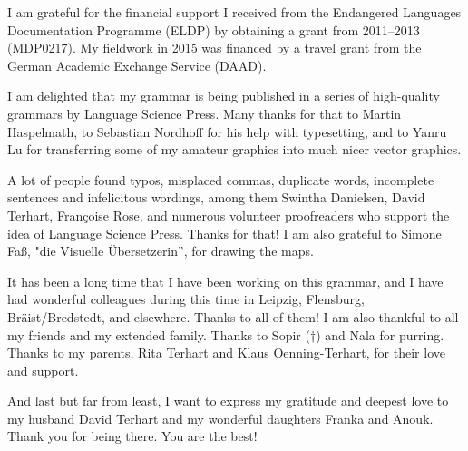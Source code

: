 I am grateful for the financial support I received from the Endangered Languages Documentation Programme (ELDP) by obtaining a grant from 2011–2013 (MDP0217). My fieldwork in 2015 was financed by a travel grant from the German Academic Exchange Service (DAAD).

I am delighted that my grammar is being published in a series of high-quality grammars by Language Science Press. Many thanks for that to Martin Haspelmath, to Sebastian Nordhoff for his help with typesetting, and to Yanru Lu for transferring some of my amateur graphics into much nicer vector graphics. 

A lot of people found typos, misplaced commas, duplicate words, incomplete sentences and infelicitous wordings, among them Swintha Danielsen, David Terhart, Françoise Rose, and numerous volunteer proofreaders who support the idea of Language Science Press. Thanks for that! I am also grateful to Simone Faß, "die Visuelle Übersetzerin”, for drawing the maps.

It has been a long time that I have been working on this grammar, and I have had wonderful colleagues during this time in Leipzig, Flensburg, Bräist/Bredstedt, and elsewhere. Thanks to all of them! I am also thankful to all my friends and my extended family. Thanks to Sopir (†) and Nala for purring. Thanks to my parents, Rita Terhart and Klaus Oenning-Terhart, for their love and support.

And last but far from least, I want to express my gratitude and deepest love to my husband David Terhart and my wonderful daughters Franka and Anouk. Thank you for being there. You are the best!



